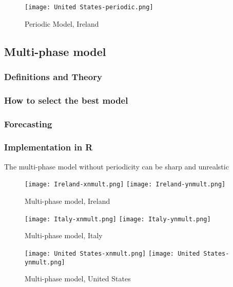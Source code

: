 \begin{figure}[H]
  \texttt{[image: United States-periodic.png]} \label{fig:usa-periodic}
\endminipage
\caption{Periodic Model, Ireland}
\end{figure}

\subsection{Multi-phase model}

\subsubsection{Definitions and Theory}

\subsubsection{How to select the best model}

\subsubsection{Forecasting}

\subsubsection{Implementation in R}

The multi-phase model without periodicity can be sharp and unrealstic

\begin{figure}[H]
  \texttt{[image: Ireland-xnmult.png]} \label{fig:ireland-xnmult}
\endminipage\hfill
{}
  \texttt{[image: Ireland-ynmult.png]} \label{fig:ireland-ynmult}
\endminipage
\caption{Multi-phase model, Ireland}
\end{figure}

\begin{figure}[H]
  \texttt{[image: Italy-xnmult.png]} \label{fig:italy-xnmult}
\endminipage\hfill
{}
  \texttt{[image: Italy-ynmult.png]} \label{fig:italy-ynmult}
\endminipage
\caption{Multi-phase model, Italy}
\end{figure}

\begin{figure}[H]
  \texttt{[image: United States-xnmult.png]} \label{fig:usa-xnmult}
\endminipage\hfill
{}
  \texttt{[image: United States-ynmult.png]} \label{fig:usa-ynmult}
\endminipage
\caption{Multi-phase model, United States}
\end{figure}

